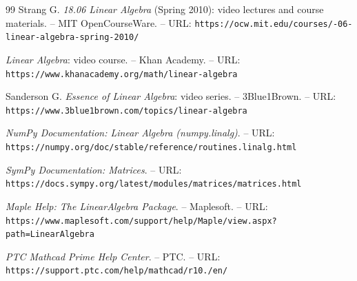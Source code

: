 \begin{thebibliography}{99}
Strang G. \textit{18.06 Linear Algebra} (Spring 2010): video lectures and
course materials. – MIT OpenCourseWare. –
URL: \texttt{https:/\allowbreak /\allowbreak ocw.\allowbreak mit.\allowbreak edu/\allowbreak courses/-06-linear-algebra-spring-2010/}

\textit{Linear Algebra}: video course. – Khan Academy. –
URL: \texttt{https:/\allowbreak /\allowbreak www.\allowbreak khanacademy.\allowbreak org/\allowbreak math/\allowbreak linear-algebra}

Sanderson G. \textit{Essence of Linear Algebra}: video series. –
3Blue1Brown. – URL: \texttt{https:/\allowbreak /\allowbreak www.\allowbreak 3blue1brown.\allowbreak com/\allowbreak topics/\allowbreak linear-algebra}

\textit{NumPy Documentation: Linear Algebra (numpy.linalg)}. –
URL: \texttt{https:/\allowbreak /\allowbreak numpy.\allowbreak org/\allowbreak doc/\allowbreak stable/\allowbreak reference/\allowbreak routines.\allowbreak linalg.\allowbreak html}

\textit{SymPy Documentation: Matrices}. –
URL: \texttt{https:/\allowbreak /\allowbreak docs.\allowbreak sympy.\allowbreak org/\allowbreak latest/\allowbreak modules/\allowbreak matrices/\allowbreak matrices.\allowbreak html}

\textit{Maple Help: The LinearAlgebra Package}. – Maplesoft. –
URL: \texttt{https:/\allowbreak /\allowbreak www.\allowbreak maplesoft.\allowbreak com/\allowbreak support/\allowbreak help/\allowbreak Maple/\allowbreak view.\allowbreak aspx?\allowbreak path=\allowbreak LinearAlgebra}

\textit{PTC Mathcad Prime Help Center}. – PTC. –
URL: \texttt{https:/\allowbreak /\allowbreak support.\allowbreak ptc.\allowbreak com/\allowbreak help/\allowbreak mathcad/\allowbreak r10./\allowbreak en/}

\end{thebibliography}
\endgroup
